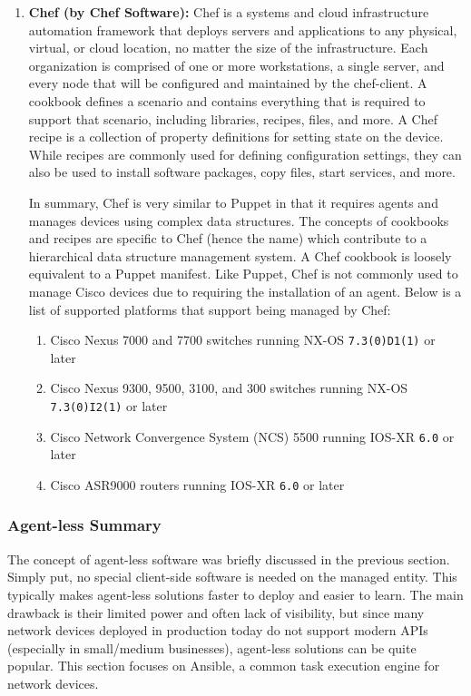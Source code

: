 \begin{enumerate}
  \item \textbf{Chef (by Chef Software):} Chef is a systems and cloud
  infrastructure automation framework that deploys servers and applications to
  any physical, virtual, or cloud location, no matter the size of the
  infrastructure. Each organization is comprised of one or more workstations,
  a single server, and every node that will be configured and maintained by
  the chef-client. A cookbook defines a scenario and contains everything that
  is required to support that scenario, including libraries, recipes, files,
  and more. A Chef recipe is a collection of property definitions for setting
  state on the device. While recipes are commonly used for defining
  configuration settings, they can also be used to install software packages,
  copy files, start services, and more.

  In summary, Chef is very similar to Puppet in that it requires agents and
  manages devices using complex data structures. The concepts of cookbooks and
  recipes are specific to Chef (hence the name) which contribute to a
  hierarchical data structure management system. A Chef cookbook is loosely
  equivalent to a Puppet manifest. Like Puppet, Chef is not commonly used to
  manage Cisco devices due to requiring the installation of an agent. Below is
  a list of supported platforms that support being managed by Chef:

  \begin{enumerate}
    \item Cisco Nexus 7000 and 7700 switches running NX-OS \verb|7.3(0)D1(1)| or later
    \item Cisco Nexus 9300, 9500, 3100, and 300 switches running NX-OS
 	\verb|7.3(0)I2(1)| or later
    \item Cisco Network Convergence System (NCS) 5500 running IOS-XR \verb|6.0| or later
    \item Cisco ASR9000 routers running IOS-XR \verb|6.0| or later
  \end{enumerate}
\end{enumerate}

\subsubsection{Agent-less Summary}
The concept of agent-less software was briefly discussed in the previous
section. Simply put, no special client-side software is needed on the managed
entity. This typically makes agent-less solutions faster to deploy and easier
to learn. The main drawback is their limited power and often lack of
visibility, but since many network devices deployed in production today do not
support modern APIs (especially in small/medium businesses), agent-less
solutions can be quite popular. This section focuses on Ansible, a common task
execution engine for network devices.

